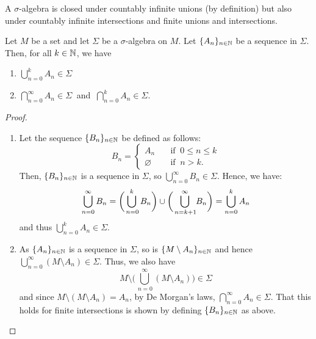 A $\sigma$-algebra is closed under countably infinite unions (by definition) but also under countably infinite intersections and finite unions and intersections.
\begin{proposition}
Let $M$ be a set and let $\Sigma$ be a $\sigma$-algebra on $M$. Let $\{ A_n \}_{n\in \mathbb{N}}$ be a sequence in $\Sigma$. Then, for all $k\in \mathbb{N}$, we have
\begin{enumerate}[label=(\roman*)]
\item $\bigcup_{n=0}^k{A_n} \in \Sigma$
\item $\bigcap_{n=0}^{\infty}{A_n} \in \Sigma \ $ and $\ \bigcap_{n=0}^k{A_n} \in \Sigma$.
\end{enumerate}
\end{proposition}

\begin{proof}
\begin{enumerate}[label=(\roman*)]
\item Let the sequence $\{B_n\}_{n\in \mathbb{N}}$ be defined as follows:
\begin{equation*}
B_n = \begin{cases} A_n \quad &\text{if }\ 0 \leq n \leq k\\
 \varnothing \quad &\text{if }\ n > k. \end{cases} 
\end{equation*}
Then, $\{B_n\}_{n\in \mathbb{N}}$ is a sequence in $\Sigma$, so $ \bigcup_{n=0}^{\infty}{B_n} \in \Sigma$. Hence, we have:
\begin{equation*}
\bigcup_{n=0}^{\infty}{B_n} = \biggl(\bigcup_{\,n=0}^{k}{B_n}\biggr)\cup \biggl(\bigcup_{\,n=k+1}^{\infty}{\negmedspace B_n}\biggr)=\bigcup_{n=0}^k{A_n}
\end{equation*}
and thus $\bigcup_{n=0}^k{A_n} \in \Sigma$.

\item As $\{A_n\}_{n\in \mathbb{N}}$ is a sequence in $\Sigma$, so is $\{M\setminus A_n\}_{n\in \mathbb{N}}$ and hence $\bigcup_{n=0}^{\infty}{(M\setminus A_n)} \in \Sigma$. Thus, we also have
\begin{equation*}
M \setminus \biggl( \bigcup_{\,n=0}^{\infty}{(M\setminus A_n)} \biggr) \in \Sigma
\end{equation*}
and since $M\setminus(M\setminus A_n)=A_n$, by De Morgan's laws, $\bigcap_{n=0}^{\infty}{A_n} \in \Sigma$. That this holds for finite intersections is shown by defining $\{B_n\}_{n\in \mathbb{N}}$ as above. \qedhere
\end{enumerate}
\end{proof}


